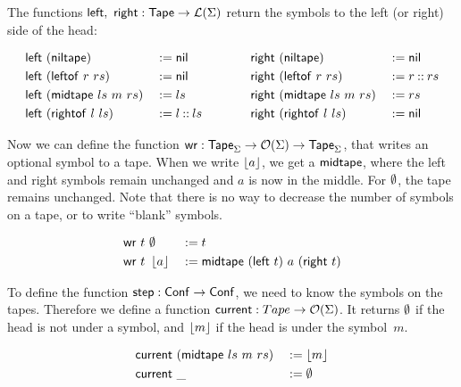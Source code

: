 The functions $\mathsf{left},~\mathsf{right} : \mathsf{Tape} \rightarrow \mathcal{L}(\Sigma)$ return the symbols to the left (or right) side of the head:
\begin{definition}
  \begin{alignat*}{4}
    \mathsf{left} &~(\mathsf{niltape})                 &&:= \mathsf{nil}
    \quad\quad\quad\quad
    & \mathsf{right}&~(\mathsf{niltape})               &&:= \mathsf{nil} \\
    \mathsf{left} &~(\mathsf{leftof}~{r}~{rs})         &&:= \mathsf{nil}
    & \mathsf{right}&~(\mathsf{leftof}~{r}~{rs})       &&:= r \mathbin{::} rs \\
    \mathsf{left} &~(\mathsf{midtape}~{ls}~{m}~{rs})   &&:= ls
    & \mathsf{right}&~(\mathsf{midtape}~{ls}~{m}~{rs}) &&:= rs \\
    \mathsf{left} &~(\mathsf{rightof}~{l}~{ls})        &&:= l \mathbin{::} ls
    & \mathsf{right}&~(\mathsf{rightof}~{l}~{ls})      &&:= \mathsf{nil}
  \end{alignat*}
\end{definition}


Now we can define the function $\mathsf{wr} : \mathsf{Tape}_\Sigma \rightarrow \mathcal{O}(\Sigma) \rightarrow \mathsf{Tape}_\Sigma$, that writes an optional symbol to a tape.  When we
write $\left\lfloor {a} \right\rfloor$, we get a $\mathsf{midtape}$, where the left and right symbols remain unchanged and $a$ is now in the middle.  For $\emptyset$, the tape
remains unchanged.  Note that there is no way to decrease the number of symbols on a tape, or to write ``blank'' symbols.

\begin{definition}
  \begin{alignat*}{3}
    \mathsf{wr}~t &~ \emptyset   &&:= t \\
    \mathsf{wr}~t &~ \left\lfloor {a} \right\rfloor &&:= \mathsf{midtape}~(\mathsf{left}~t)~{a}~(\mathsf{right}~t)
  \end{alignat*}
\end{definition}

To define the function $\mathsf{step} : \mathsf{Conf} \rightarrow \mathsf{Conf}$, we need to know the symbols on the tapes.  Therefore we define a function
$\mathsf{current} : Tape \rightarrow \mathcal{O}(\Sigma)$.  It returns $\emptyset$ if the head is not under a symbol, and $\left\lfloor {m} \right\rfloor$ if the head is under the
symbol~$m$.

\begin{definition}[$\MS{current}$][current]
  \begin{alignat*}{2}
    \mathsf{current}&~(\mathsf{midtape}~{ls}~{m}~{rs})&&:= \left\lfloor {m} \right\rfloor \\
    \mathsf{current}&~\_                          &&:= \emptyset
  \end{alignat*}
\end{definition}

